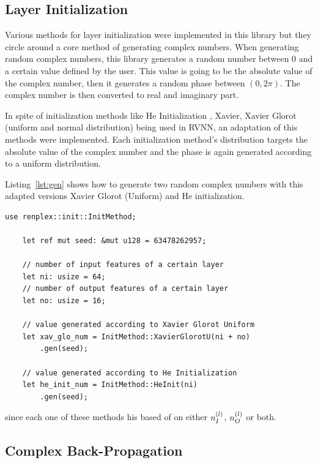 \subsection{Layer Initialization}

Various methods for layer initialization were implemented in this library but they circle around a core method of generating complex numbers. When generating random complex numbers, this library generates a random number between 0 and a certain value defined by the user. This value is going to be the absolute value of the complex number, then it generates a random phase between $  (0, 2\pi) $. The complex number is then converted to real and imaginary part.

In spite of initialization methods like He Initialization \parencite{he2015delving}, Xavier, Xavier Glorot (uniform and normal distribution) \parencite{glorot2010understanding} being used in RVNN, an adaptation of this methods were implemented. Each initialization method's distribution targets the absolute value of the complex number and the phase is again generated according to a uniform distribution.

Listing~\ref{lst:gen} shows how to generate two random complex numbers with this adapted versions Xavier Glorot (Uniform) and He initialization.

\begin{lstlisting}[label=lst:gen,caption=Demonstration of how to generate complex random numbers with Xavier Glorot Uniform and He initialization respectively.]
	use renplex::init::InitMethod;
	
	let ref mut seed: &mut u128 = 63478262957;
	
	// number of input features of a certain layer
	let ni: usize = 64;
	// number of output features of a certain layer
	let no: usize = 16;
	
	// value generated according to Xavier Glorot Uniform
	let xav_glo_num = InitMethod::XavierGlorotU(ni + no)
		.gen(seed);
	
	// value generated according to He Initialization
	let he_init_num = InitMethod::HeInit(ni)
		.gen(seed);
\end{lstlisting}
since each one of these methods his based of on either $ n^{(l)}_{I} $,  $ n^{(l)}_{O} $ or both.

\subsection{Complex Back-Propagation}

